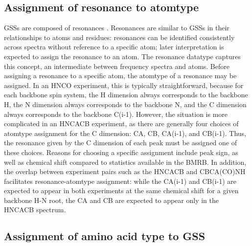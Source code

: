 \subsection{Assignment of resonance to atomtype}
GSSs are composed of resonances \cite{ccpn}.  Resonances are 
similar to GSSs in their relationships to atoms and residues: resonances can 
be identified consistently across spectra without reference to a specific 
atom; later interpretation is expected to assign the resonance to an atom.  
The resonance datatype captures this concept, an intermediate between 
frequency spectra and atoms.  Before assigning a resonance to a specific 
atom, the atomtype of a resonance may be assigned.  In an HNCO experiment, 
this is typically straightforward, because for each backbone spin system, 
the H dimension always corresponds to the backbone H, the N dimension always 
corresponds to the backbone N, and the C dimension always corresponds to the 
backbone C(i-1).  However, the situation is more complicated in an HNCACB 
experiment, as there are generally four choices of atomtype assignment for 
the C dimension:  CA, CB, CA(i-1), and CB(i-1).  Thus, the resonance given 
by the C dimension of each peak must be assigned one of these choices.  
Reasons for choosing a specific assignment include peak sign, as well as 
chemical shift compared to statistics available in the BMRB.  In addition, 
the overlap between experiment pairs such as the HNCACB and CBCA(CO)NH 
facilitates resonance-atomtype assignment: while the CA(i-1) and CB(i-1) 
are expected to appear in both experiments at the same chemical shift for 
a given backbone H-N root, the CA and CB are expected to appear only in the 
HNCACB spectrum.

\subsection{Assignment of amino acid type to GSS}

